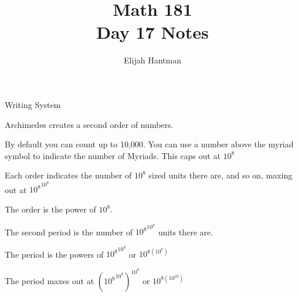 \documentclass{report}
\title{\Huge{Math 181}\\Day 17 Notes}
\author{\huge{Elijah Hantman}}
\date{}
\begin{document}
\maketitle
\newpage

\begin{description}
    \item Writing System 
        \begin{mdframed}
            Archimedes creates a second order of numbers.

            By default you can count up to 10,000.
            You can use a number above the myriad symbol
            to indicate the number of Myriads. This caps
            out at $10^8$

            Each order indicates the number of $10^8$ sized units
            there are, and so on, maxing out at  ${10^8}^{10^8}$ 

            The order is the power of $10^8$.

            The second period is the number of ${10^8}^{10^8}$ units
            there are.

            The period is the powers of ${10^8}^{10^8}$ or $10^{8(10^8)}$

            The period maxes out at  $({10^8}^{10^8})^{10^8}$ 
            or $10^{8(10^{16})}$

        \end{mdframed}
\end{description}
\end{document}
